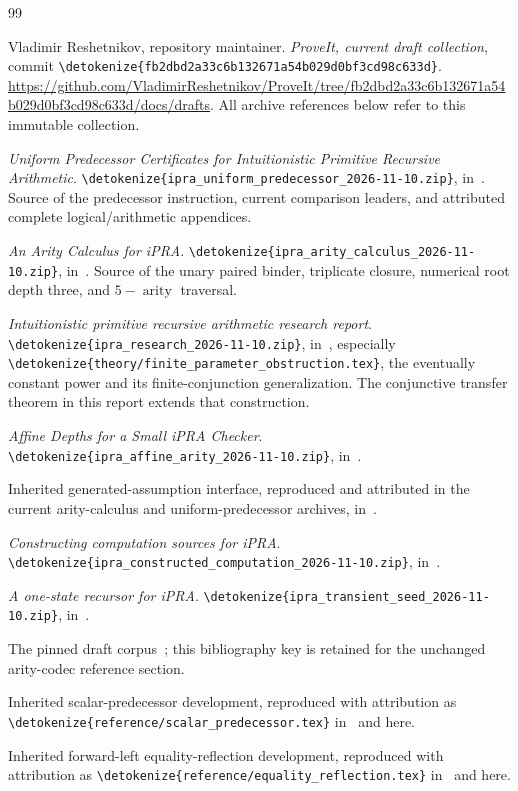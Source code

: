 \documentclass[11pt,letterpaper]{article}
\theoremstyle{definition}\newtheorem{definition}[theorem]{Definition}
\theoremstyle{remark}\newtheorem{remark}[theorem]{Remark}
\newcommand{\file}[1]{\expandafter\nolinkurl\expandafter{\detokenize{#1}}}
\begin{document}
\clearpage
\begin{thebibliography}{99}\raggedright
{}
Vladimir Reshetnikov, repository maintainer.
\emph{ProveIt, current draft collection}, commit
\file{fb2dbd2a33c6b132671a54b029d0bf3cd98c633d}.
\url{https://github.com/VladimirReshetnikov/ProveIt/tree/fb2dbd2a33c6b132671a54b029d0bf3cd98c633d/docs/drafts}.
All archive references below refer to this immutable collection.

\emph{Uniform Predecessor Certificates for Intuitionistic Primitive
Recursive Arithmetic}. \file{ipra_uniform_predecessor_2026-11-10.zip},
in~\cite{snapshot}. Source of the predecessor instruction, current
comparison leaders, and attributed complete logical/arithmetic appendices.

\emph{An Arity Calculus for iPRA}.
\file{ipra_arity_calculus_2026-11-10.zip}, in~\cite{snapshot}.
Source of the unary paired binder, triplicate closure, numerical root
depth three, and $5-\operatorname{arity}$ traversal.

\emph{Intuitionistic primitive recursive arithmetic research report}.
\file{ipra_research_2026-11-10.zip}, in~\cite{snapshot}, especially
\file{theory/finite_parameter_obstruction.tex}, the eventually constant power and its
finite-conjunction generalization. The conjunctive transfer theorem in
this report extends that construction.

\emph{Affine Depths for a Small iPRA Checker}.
\file{ipra_affine_arity_2026-11-10.zip}, in~\cite{snapshot}.

Inherited generated-assumption interface, reproduced and attributed in
the current arity-calculus and uniform-predecessor archives,
in~\cite{snapshot}.

\emph{Constructing computation sources for iPRA}.
\file{ipra_constructed_computation_2026-11-10.zip}, in~\cite{snapshot}.

\emph{A one-state recursor for iPRA}.
\file{ipra_transient_seed_2026-11-10.zip}, in~\cite{snapshot}.

The pinned draft corpus~\cite{snapshot}; this bibliography key is retained
for the unchanged arity-codec reference section.

Inherited scalar-predecessor development, reproduced with attribution
as \file{reference/scalar_predecessor.tex} in~\cite{uniform} and here.

Inherited forward-left equality-reflection development, reproduced with
attribution as \file{reference/equality_reflection.tex} in~\cite{uniform}
and here.


\end{thebibliography}
\end{document}
